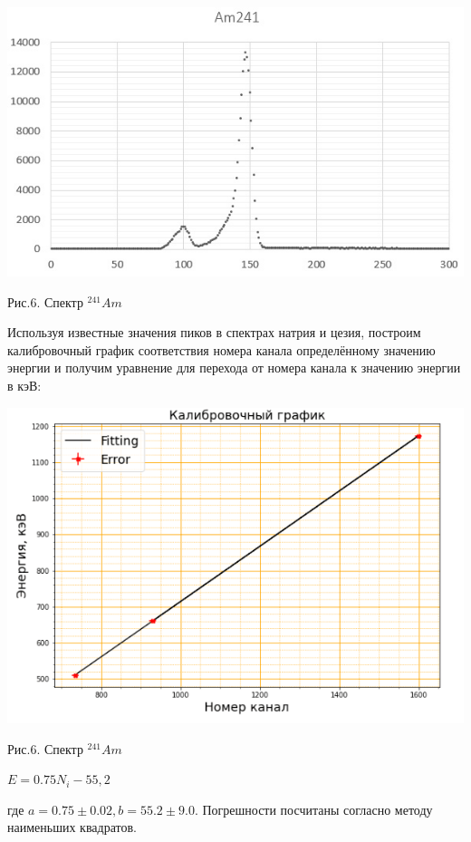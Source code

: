 \documentclass[14pt,a4paper]{scrartcl}
\begin{document}
\begin{center}
\includegraphics[scale=0.7]{Am.jpg}\newline
\caption{Рис.6. Спектр $^{241} Am$}
\end{center}



Используя известные значения пиков в спектрах натрия и цезия, построим калибровочный график соответствия номера канала определённому значению энергии и получим уравнение для перехода от номера канала к значению энергии в кэВ:


\begin{center}
\includegraphics[scale=0.7]{calibr.png}\newline
\caption{Рис.6. Спектр $^{241} Am$}
\end{center}





\begin{center}
    $E = 0.75N_i - 55,2$
\end{center}
где $a = 0.75 \pm 0.02, b = 55.2 \pm 9.0$. Погрешности посчитаны согласно методу наименьших квадратов.\\
\end{document}
